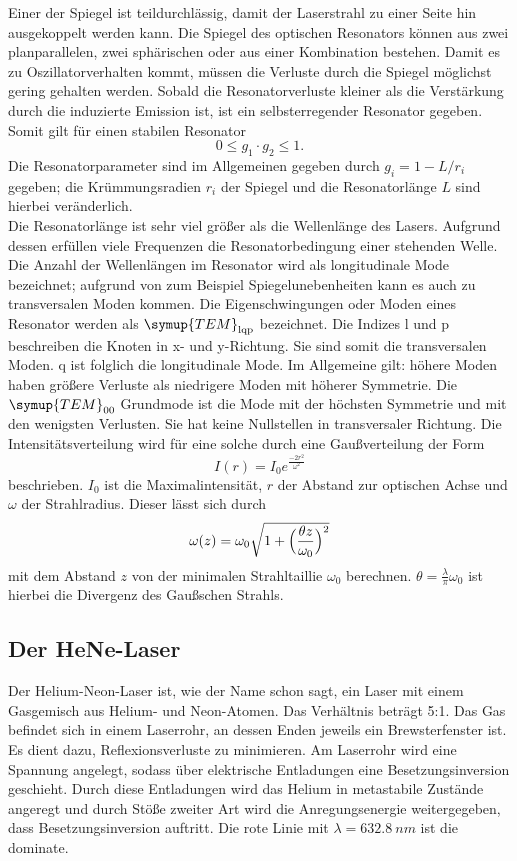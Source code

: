 Einer der Spiegel ist teildurchlässig, damit der Laserstrahl zu einer Seite hin ausgekoppelt werden kann.
Die Spiegel des optischen Resonators können aus zwei planparallelen, zwei sphärischen oder aus einer Kombination bestehen.
Damit es zu Oszillatorverhalten kommt, müssen die Verluste durch die Spiegel möglichst gering gehalten werden.
Sobald die Resonatorverluste kleiner als die Verstärkung durch die induzierte Emission ist, ist ein selbsterregender Resonator gegeben.
Somit gilt für einen stabilen Resonator
\begin{equation}
  0 \leq g_1 \cdot g_2 \leq 1.
\end{equation}
Die Resonatorparameter sind im Allgemeinen gegeben durch $g_i=1-L/r_i$ gegeben;
die Krümmungsradien $r_i$ der Spiegel und die Resonatorlänge $L$ sind hierbei veränderlich.\\
Die Resonatorlänge ist sehr viel größer als die Wellenlänge des Lasers.
Aufgrund dessen erfüllen viele Frequenzen die Resonatorbedingung einer stehenden Welle.
Die Anzahl der Wellenlängen im Resonator wird als longitudinale Mode bezeichnet; aufgrund von zum Beispiel Spiegelunebenheiten kann es auch zu transversalen Moden kommen.
Die Eigenschwingungen oder Moden eines Resonator werden als $\symup{TEM}_\text{lqp}$ bezeichnet. Die Indizes l und p beschreiben die Knoten in x- und y-Richtung. Sie sind somit die transversalen Moden.
q ist folglich die longitudinale Mode.
Im Allgemeine gilt: höhere Moden haben größere Verluste als niedrigere Moden mit höherer Symmetrie.
Die $\symup{TEM}_\text{00}$ Grundmode ist die Mode mit der höchsten Symmetrie und mit den wenigsten Verlusten. Sie hat keine Nullstellen in transversaler Richtung.
Die Intensitätsverteilung wird für eine solche durch eine Gaußverteilung der Form
\begin{equation}
I(r)=I_0e^{\frac{-2r^2}{\omega^2}}
\end{equation}
beschrieben.
$I_0$ ist die Maximalintensität, $r$ der Abstand zur optischen Achse und $\omega$ der Strahlradius.
Dieser lässt sich durch
\begin{equation}
  \omega(z)=\omega_0\sqrt{1+\Bigl(\frac{\theta z}{\omega_0}\Bigr)^2}
\end{equation}
mit dem Abstand $z$ von der minimalen Strahltaillie $\omega_0$ berechnen.
$\theta=\frac{\lambda}{\pi}\omega_0$ ist hierbei die Divergenz des Gaußschen Strahls.
\subsection{Der HeNe-Laser}
Der Helium-Neon-Laser ist, wie der Name schon sagt, ein Laser mit einem Gasgemisch aus Helium- und Neon-Atomen.
Das Verhältnis beträgt 5:1.
Das Gas befindet sich in einem Laserrohr, an dessen Enden jeweils ein Brewsterfenster ist. Es dient dazu, Reflexionsverluste zu minimieren.
Am Laserrohr wird eine Spannung angelegt, sodass über elektrische Entladungen eine Besetzungsinversion geschieht.
Durch diese Entladungen wird das Helium in metastabile Zustände angeregt und durch Stöße zweiter Art wird die Anregungsenergie weitergegeben, dass Besetzungsinversion auftritt.
Die rote Linie mit $\lambda = \SI{632.8}{nm}$ ist die dominate.

